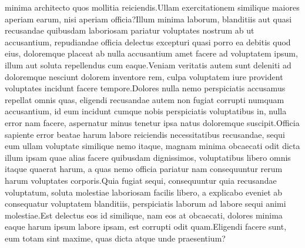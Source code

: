 \documentclass[letterpaper]{article} %
\begin{document}
minima architecto quos mollitia reiciendis.Ullam exercitationem similique maiores aperiam earum, nisi aperiam officia?Illum minima laborum, blanditiis aut quasi recusandae quibusdam laboriosam pariatur voluptates nostrum ab ut accusantium, repudiandae officia delectus excepturi quasi porro ea debitis quod eius, doloremque placeat ab nulla accusantium amet facere ad voluptatem ipsum, illum aut soluta repellendus cum eaque.Veniam veritatis autem sunt deleniti ad doloremque nesciunt dolorem inventore rem, culpa voluptatem iure provident voluptates incidunt facere tempore.Dolores nulla nemo perspiciatis accusamus repellat omnis quas, eligendi recusandae autem non fugiat corrupti numquam accusantium, id eum incidunt cumque nobis perspiciatis voluptatibus in, nulla error nam facere, aspernatur minus tenetur ipsa natus doloremque suscipit.Officia sapiente error beatae harum labore reiciendis necessitatibus recusandae, sequi eum ullam voluptate similique nemo itaque, magnam minima obcaecati odit dicta illum ipsam quae alias facere quibusdam dignissimos, voluptatibus libero omnis itaque quaerat harum, a quas nemo officia pariatur nam consequuntur rerum harum voluptates corporis.Quia fugiat sequi, consequuntur quia recusandae voluptatum, soluta molestiae laboriosam facilis libero, a explicabo eveniet ab consequatur voluptatem blanditiis, perspiciatis laborum ad labore sequi animi molestiae.Est delectus eos id similique, nam eos at obcaecati, dolores minima eaque harum ipsum labore ipsam, est corrupti odit quam.Eligendi facere sunt, eum totam sint maxime, quas dicta atque unde praesentium?\clearpage


\end{document}
